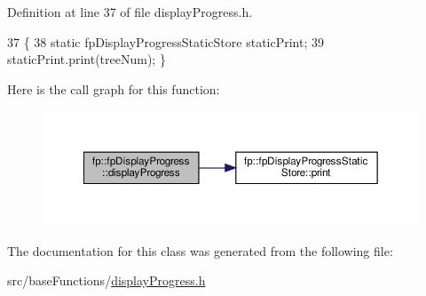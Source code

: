 Definition at line 37 of file display\+Progress.\+h.


\begin{DoxyCode}
37                                                  \{ 
38             \textcolor{keyword}{static} fpDisplayProgressStaticStore staticPrint;
39             staticPrint.print(treeNum); \} 
\end{DoxyCode}
Here is the call graph for this function\+:
\nopagebreak
\begin{figure}[H]
\begin{center}
\leavevmode
\includegraphics[width=350pt]{classfp_1_1fpDisplayProgress_adf5b2e390618d63eccb6de3b00eb857b_cgraph}
\end{center}
\end{figure}


The documentation for this class was generated from the following file\+:\begin{DoxyCompactItemize}
\item 
src/base\+Functions/\hyperlink{displayProgress_8h}{display\+Progress.\+h}\end{DoxyCompactItemize}
